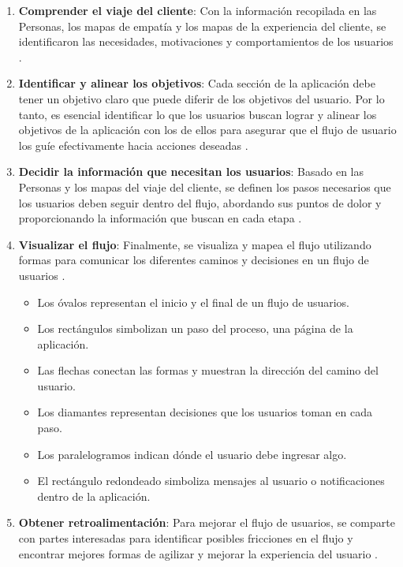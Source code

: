 \begin{enumerate}
    \item \textbf{Comprender el viaje del cliente}: Con la información recopilada en las Personas, los mapas de empatía y los mapas de la experiencia del cliente, se identificaron las necesidades, motivaciones y comportamientos de los usuarios \cite{Adobe2022}.
    
    \item \textbf{Identificar y alinear los objetivos}: Cada sección de la aplicación debe tener un objetivo claro que puede diferir de los objetivos del usuario. Por lo tanto, es esencial identificar lo que los usuarios buscan lograr y alinear los objetivos de la aplicación con los de ellos para asegurar que el flujo de usuario los guíe efectivamente hacia acciones deseadas \cite{Adobe2022}.
    
    \item \textbf{Decidir la información que necesitan los usuarios}: Basado en las Personas y los mapas del viaje del cliente, se definen los pasos necesarios que los usuarios deben seguir dentro del flujo, abordando sus puntos de dolor y proporcionando la información que buscan en cada etapa \cite{Adobe2022}.
    
    \item \textbf{Visualizar el flujo}: Finalmente, se visualiza y mapea el flujo utilizando formas para comunicar los diferentes caminos y decisiones en un flujo de usuarios \cite{Adobe2022}.
    \begin{itemize}
        \item Los óvalos representan el inicio y el final de un flujo de usuarios.
        \item Los rectángulos simbolizan un paso del proceso, una página de la aplicación.
        \item Las flechas conectan las formas y muestran la dirección del camino del usuario.
        \item Los diamantes representan decisiones que los usuarios toman en cada paso.
        \item Los paralelogramos indican dónde el usuario debe ingresar algo.
        \item El rectángulo redondeado simboliza mensajes al usuario o notificaciones dentro de la aplicación.
    \end{itemize}
    
    \item \textbf{Obtener retroalimentación}: Para mejorar el flujo de usuarios, se comparte con partes interesadas para identificar posibles fricciones en el flujo y encontrar mejores formas de agilizar y mejorar la experiencia del usuario \cite{Adobe2022}.
\end{enumerate}

